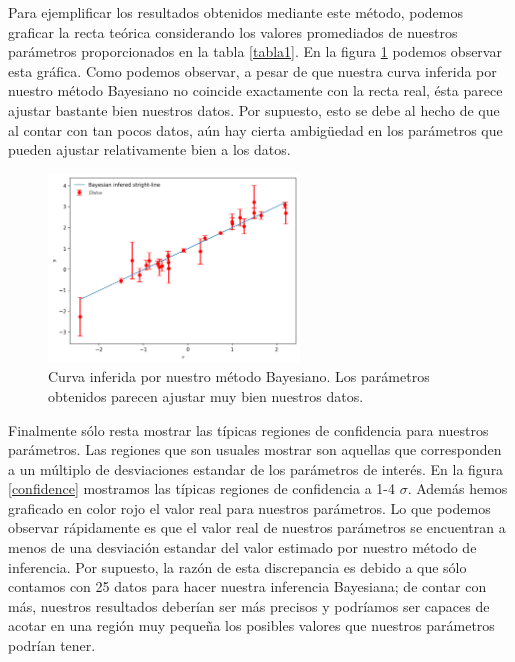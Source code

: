 \documentclass[10.5pt,prb,
               showpacs,            %
               preprintnumbers,     %
               aps,                 %
               prl,          	    %
               letterpaper,             %
               superscriptaddress,      %
               nofootinbib,         %
               tightenlines,        %
               floats,floatfix      %
               ,usenatbib]{revtex4-1}%
\begin{document}
Para ejemplificar los resultados obtenidos mediante este m\'etodo, podemos graficar la recta te\'orica considerando los valores promediados de nuestros par\'ametros proporcionados en la tabla \ref{tabla1}. En la figura \ref{fig:datastr} podemos observar esta gr\'afica. Como podemos observar, a pesar de que nuestra curva inferida por nuestro m\'etodo Bayesiano no coincide exactamente con la recta real, \'esta parece ajustar bastante bien nuestros datos. Por supuesto, esto se debe al hecho de que al contar con tan pocos datos, a\'un hay cierta ambig\"uedad en los par\'ametros que pueden ajustar relativamente bien a los datos. 

\begin{figure}[ht] 
\includegraphics[trim = 1mm  1mm 1mm 1mm, clip, width=8.cm, height=5cm]{datastr.png}
\caption{Curva inferida por nuestro m\'etodo Bayesiano. Los par\'ametros obtenidos parecen ajustar muy bien nuestros datos.}%
\label{fig:datastr}
\end{figure}



Finalmente s\'olo resta mostrar las t\'ipicas regiones de confidencia para nuestros par\'ametros. Las regiones que son usuales mostrar son aquellas que corresponden a un m\'ultiplo de desviaciones estandar de los par\'ametros de inter\'es. En la figura \ref{confidence} mostramos las t\'ipicas regiones de confidencia a 1-4 $\sigma$. Adem\'as hemos graficado en color rojo el valor real para nuestros par\'ametros. Lo que podemos observar r\'apidamente es que el valor real de nuestros par\'ametros se encuentran a menos de una desviaci\'on estandar del valor estimado por nuestro m\'etodo de inferencia. Por supuesto, la raz\'on de esta discrepancia es debido a que s\'olo contamos con 25 datos para hacer nuestra inferencia Bayesiana; de contar con m\'as, nuestros resultados deber\'ian ser m\'as precisos y podr\'iamos ser capaces de acotar en una regi\'on muy peque\~na los posibles valores que nuestros par\'ametros podr\'ian tener.  
\end{document}
